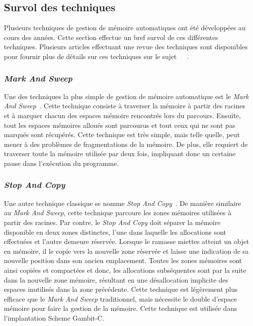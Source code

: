 \documentclass[12pt,oneside,letterpaper,francais]{book}
\begin{document}
\subsection{Survol des techniques}
Plusieurs techniques de gestion de mémoire automatiques ont été
développées au cours des années. Cette section effectue un bref survol
de ces différentes techniques. Plusieurs articles effectuant une revue
des techniques sont disponibles pour fournir plus de détails sur ces
techniques sur le
sujet~\cite{GC_REVIEW1}~\cite{GC_REVIEW2}~\cite{GC_REVIEW3}. 

\subsubsection{\textit{Mark And Sweep}}
Une des techniques la plus simple de gestion de mémoire automatique
est le \textit{Mark And Sweep}~\cite{LISP_ORIGINS}. Cette technique
consiste à traverser la mémoire à partir des racines et à marquer
chacun des espaces mémoire rencontrés lors du parcours. Ensuite, tout
les espaces mémoires alloués sont parcourus et tout ceux qui ne sont
pas marqués sont récupérés. Cette technique est très simple, mais
telle quelle, peut mener à des problèmes de fragmentations de la
mémoire. De plus, elle requiert de traverser toute la mémoire utilisée
par deux fois, impliquant donc un certaine pause dans l'exécution du
programme.

\subsubsection{\textit{Stop And Copy}}
Une autre technique classique se nomme \textit{Stop And
  Copy}~\cite{STOP_AND_COPY}. De manière similaire au \textit{Mark And
  Sweep}, cette technique parcoure les zones mémoires utilisées à
partir des racines. Par contre, le \textit{Stop And Copy} doit séparer
la mémoire disponible en deux zones distinctes, l'une dans laquelle
les allocations sont effectuées et l'autre demeure réservée. Lorsque
le ramasse miettes atteint un objet en mémoire, il le copie vers la
nouvelle zone réservée et laisse une indication de sa nouvelle
position dans son ancien emplacement. Toutes les zones mémoires sont
ainsi copiées et compactées et donc, les allocations subséquentes sont
par la suite dans la nouvelle zone mémoire, résultant en une
désallocation implicite des espaces inutilisés dans la zone
précédente. Cette technique est légèrement plus efficace que le
\textit{Mark And Sweep} traditionnel, mais nécessite le double
d'espace mémoire pour faire la gestion de la mémoire. Cette technique
est utilisée dans l'implantation Scheme Gambit-C.
\end{document}
